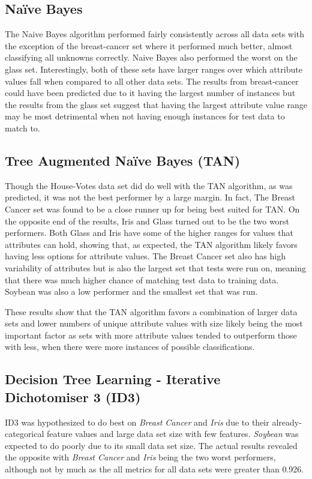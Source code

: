 \subsection{Na\"{i}ve Bayes}
The Naive Bayes algorithm performed fairly consistently across all data sets with the exception of the breast-cancer set where it performed much better, almost classifying all unknowns correctly. Naive Bayes also performed the worst on the glass set. 
Interestingly, both of these sets have larger ranges over which attribute values fall when compared to all other data sets. 
The results from breast-cancer could have been predicted due to it having the largest number of instances but the results from the glass set suggest that having the largest attribute value range may be most detrimental when not having enough instances for test data to match to. 


\subsection{Tree Augmented Na\"{i}ve Bayes (TAN)}
Though the House-Votes data set did do well with the TAN algorithm, as was predicted, it was not the best performer by a large margin.
In fact, The Breast Cancer set was found to be a close runner up for being best suited for TAN.  
On the opposite end of the results, Iris and Glass turned out to be the two worst performers. Both Glass and Iris have some of the higher ranges for values that attributes can hold, showing that, as expected, the TAN algorithm likely favors having less options for attribute values.  The Breast Cancer set also has high variability of attributes but is also the largest set that tests were run on, meaning that there was much higher chance of matching test data to training data. Soybean was also a low performer and the smallest set that was run.

These results show that the TAN algorithm favors a combination of larger data sets and lower numbers of unique attribute values with size likely being the most important factor as sets with more attribute values tended to outperform those with less, when there were more instances of possible classifications. 


\subsection{Decision Tree Learning - Iterative Dichotomiser 3 (ID3)}
ID3 was hypothesized to do best on \textit{Breast Cancer} and \textit{Iris} due to their already-categorical feature values and large data set size with few features. \textit{Soybean} was expected to do poorly due to its small data set size.
The actual results revealed the opposite with \textit{Breast Cancer} and \textit{Iris} being the two worst performers, although not by much as the all metrics for all data sets were greater than 0.926.

